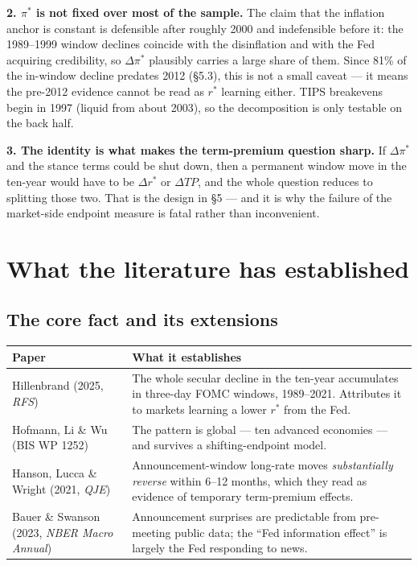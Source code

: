 \documentclass[11pt]{article}
\newcommand{\rs}{$r^{*}$}
\begin{document}
\textbf{2. $\pi^{*}$ is not fixed over most of the sample.} The claim that the inflation
anchor is constant is defensible after roughly 2000 and indefensible before it: the 1989--1999
window declines coincide with the disinflation and with the Fed acquiring credibility, so
$\Delta\pi^{*}$ plausibly carries a large share of them. Since 81\% of the in-window decline
predates 2012 (\S5.3), this is not a small caveat --- it means the pre-2012 evidence cannot
be read as \rs{} learning either. TIPS breakevens begin in 1997 (liquid from about 2003), so
the decomposition is only testable on the back half.

\textbf{3. The identity is what makes the term-premium question sharp.} If $\Delta\pi^{*}$ and
the stance terms could be shut down, then a permanent window move in the ten-year would have
to be $\Delta r^{*}$ or $\Delta TP$, and the whole question reduces to splitting those two.
That is the design in \S5 --- and it is why the failure of the market-side endpoint measure
is fatal rather than inconvenient.

\section{What the literature has established}

\subsection{The core fact and its extensions}

\noindent
\begin{tabular}{@{}p{}p{}@{}}
\toprule
\textbf{Paper} & \textbf{What it establishes}\\ \midrule
Hillenbrand (2025, \emph{RFS}) & The whole secular decline in the ten-year accumulates in
three-day FOMC windows, 1989--2021. Attributes it to markets learning a lower \rs{} from
the Fed.\\[0.35em]
Hofmann, Li \& Wu (BIS WP 1252) & The pattern is global --- ten advanced economies --- and
survives a shifting-endpoint model.\\[0.35em]
Hanson, Lucca \& Wright (2021, \emph{QJE}) & Announcement-window long-rate moves
\emph{substantially reverse} within 6--12 months, which they read as evidence of temporary
term-premium effects.\\[0.35em]
Bauer \& Swanson (2023, \emph{NBER Macro Annual}) & Announcement surprises are predictable
from pre-meeting public data; the ``Fed information effect'' is largely the Fed responding
to news.\\
\bottomrule
\end{tabular}
\end{document}

